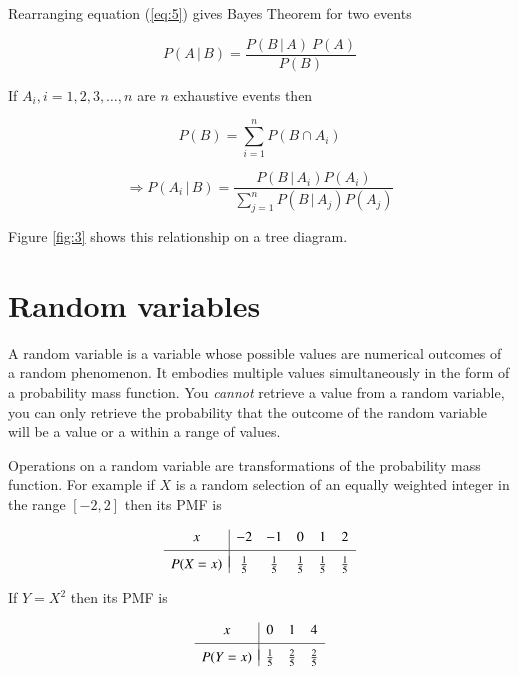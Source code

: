 \documentclass[a5paper]{article}
\begin{document}
Rearranging equation (\ref{eq:5}) gives Bayes Theorem for two events

\begin{equation}
  P(A\,|\,B) = \frac{P(B\,|\,A)\ P(A)}{P(B)}
\end{equation}

\noindent If $A_i, i = 1, 2, 3, \ldots, n$ are $n$ exhaustive events then

\begin{equation}
  P(B) = \sum_{i=1}^{n} P(B\cap A_i)
\end{equation}

\begin{equation}
  \Rightarrow P(A_i\,|\,B) = \frac{P(B\,|\,A_i) P(A_i)}{\sum\limits_{j=1}^{n}P(B\,|\,A_j) P(A_j)}
\end{equation}

\noindent Figure \ref{fig:3} shows this relationship on a tree diagram.

\section{Random variables}

A random variable is a variable whose possible values are numerical outcomes of
a random phenomenon. It embodies multiple values simultaneously in the form of a
probability mass function. You \textit{cannot} retrieve a value from a random
variable, you can only retrieve the probability that the outcome of the random
variable will be a value or a within a range of values.

Operations on a random variable are transformations of the probability mass
function. For example if $X$ is a random selection of an equally weighted
integer in the range $[-2, 2]$ then its PMF is

\begin{equation}
  \begin{array}{c|ccccc}
    x & -2 & -1 & 0 & 1 & 2 \\[3pt]
    \hline \\[-8pt]
    P(X=x) & \frac{1}{5} & \frac{1}{5} & \frac{1}{5} & \frac{1}{5} & \frac{1}{5}
  \end{array}
\end{equation}

\noindent If $Y=X^2$ then its PMF is

\begin{equation}
  \begin{array}{c|ccc}
    x & 0 & 1 & 4 \\[3pt]
    \hline \\[-8pt]
    P(Y=x) & \frac{1}{5} & \frac{2}{5} & \frac{2}{5}
  \end{array}
\end{equation}
\end{document}
